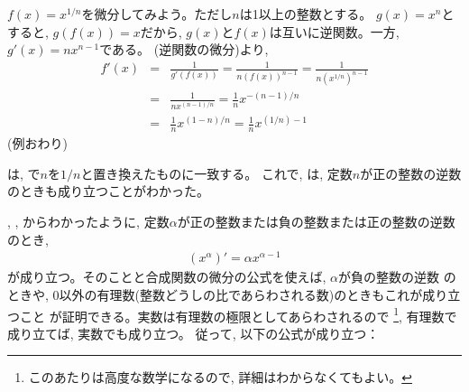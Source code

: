 \begin{exmpl}  $f(x)=x^{1/n}$を微分してみよう。ただし$n$は1以上の整数とする。
$g(x)=x^n$とすると, $g(f(x))=x$だから, $g(x)$と$f(x)$は互いに逆関数。一方, $g'(x)=nx^{n-1}$である。
(逆関数の微分)より, 
\begin{eqnarray}
f'(x)&=&\frac{1}{g'(f(x))}=\frac{1}{n(f(x))^{n-1}}=\frac{1}{n(x^{1/n})^{n-1}}\nonumber\\
&=&\frac{1}{nx^{(n-1)/n}}=\frac{1}{n}x^{-(n-1)/n}\nonumber\\
&=&\frac{1}{n}x^{(1-n)/n}=\frac{1}{n}x^{(1/n)-1}\label{eq:xpowfrc}
\end{eqnarray}
(例おわり)\end{exmpl}

は, で$n$を$1/n$と置き換えたものに一致する。
これで, は, 定数$n$が正の整数の逆数のときも成り立つことがわかった。

, , からわかったように, 
定数$\alpha$が正の整数または負の整数または正の整数の逆数のとき, 
\begin{eqnarray}(x^{\alpha})'=\alpha x^{\alpha-1}\end{eqnarray}
が成り立つ。そのことと合成関数の微分の公式を使えば, $\alpha$が負の整数の逆数
のときや, 0以外の有理数(整数どうしの比であらわされる数)のときもこれが成り立つこと
が証明できる。実数は有理数の極限としてあらわされるので
\footnote{このあたりは高度な数学になるので, 詳細はわからなくてもよい。}, 有理数で成り立てば, 実数でも成り立つ。
従って, 以下の公式が成り立つ：\hv

